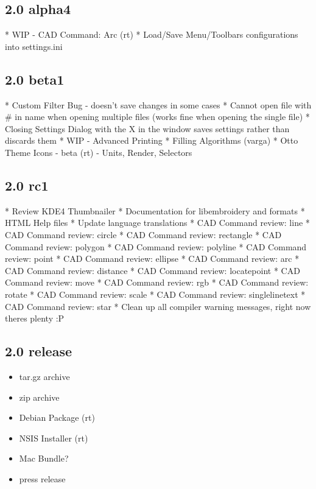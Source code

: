 \documentclass[11pt]{report}
\begin{document}
\subsection{2.0 alpha4}

* WIP - CAD Command: Arc (rt)
* Load/Save Menu/Toolbars configurations into settings.ini

\subsection{2.0 beta1}

* Custom Filter Bug - doesn't save changes in some cases
* Cannot open file with \# in name when opening multiple files (works fine when opening the single file)
* Closing Settings Dialog with the X in the window saves settings rather than discards them
* WIP - Advanced Printing
* Filling Algorithms (varga)
* Otto Theme Icons - beta (rt) - Units, Render, Selectors

\subsection{2.0 rc1}

* Review KDE4 Thumbnailer
* Documentation for libembroidery and formats
* HTML Help files
* Update language translations
* CAD Command review: line
* CAD Command review: circle
* CAD Command review: rectangle
* CAD Command review: polygon
* CAD Command review: polyline
* CAD Command review: point
* CAD Command review: ellipse
* CAD Command review: arc
* CAD Command review: distance
* CAD Command review: locatepoint
* CAD Command review: move
* CAD Command review: rgb
* CAD Command review: rotate
* CAD Command review: scale
* CAD Command review: singlelinetext
* CAD Command review: star
* Clean up all compiler warning messages, right now theres plenty :P

\subsection{2.0 release}

\begin{itemize}
\item tar.gz archive
\item zip archive
\item Debian Package (rt)
\item NSIS Installer (rt)
\item Mac Bundle?
\item press release
\end{itemize}
\end{document}
